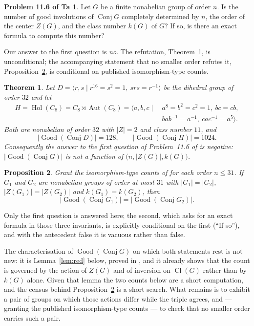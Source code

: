 \documentclass[11pt]{amsart}
\newtheorem{theorem}{Theorem}[section]
\newtheorem{proposition}[theorem]{Proposition}
\theoremstyle{definition}
\newtheorem*{problem}{Problem 11.6 of Ta}
\newcommand{\Conj}{\operatorname{Conj}}
\newcommand{\Good}{\operatorname{Good}}
\newcommand{\Cl}{\operatorname{Cl}}
\newcommand{\Zc}{Z}
\newcommand{\Hol}{\operatorname{Hol}}
\newcommand{\Aut}{\operatorname{Aut}}
\begin{document}
\begin{problem}
Let $G$ be a finite nonabelian group of order $n$. Is the number of good involutions of
$\Conj G$ completely determined by $n$, the order of the center $\Zc(G)$, and the class
number $k(G)$ of $G$? If so, is there an exact formula to compute this number?
\end{problem}

\noindent
Our answer to the first question is \emph{no}. The refutation, Theorem~\ref{thm:main}, is
unconditional; the accompanying statement that no smaller order refutes it,
Proposition~\ref{prop:min}, is conditional on published isomorphism-type counts.

\begin{theorem}\label{thm:main}
Let $D=\langle r,s\mid r^{16}=s^2=1,\ srs=r^{-1}\rangle$ be the dihedral group of order
$32$ and let
\begin{align*}
 H=\Hol(C_8)=C_8\rtimes\Aut(C_8)
 =\langle a,b,c\mid\ &a^8=b^2=c^2=1,\ bc=cb,\\
                     &bab^{-1}=a^{-1},\ cac^{-1}=a^5\rangle .
\end{align*}
Both are nonabelian of order $32$ with $\lvert \Zc\rvert=2$ and class number $11$, and
\[
 \lvert\Good(\Conj D)\rvert=128,
 \qquad
 \lvert\Good(\Conj H)\rvert=1024 .
\]
Consequently the answer to the first question of Problem~11.6 of \cite{Ta} is negative:
$\lvert\Good(\Conj G)\rvert$ is not a function of $\bigl(n,\lvert \Zc(G)\rvert,k(G)\bigr)$.
\end{theorem}

\begin{proposition}\label{prop:min}
Grant the isomorphism-type counts of \cite{A000001} for each order $n\le 31$. If $G_1$ and
$G_2$ are nonabelian groups of order at most $31$ with
$\lvert G_1\rvert=\lvert G_2\rvert$, $\lvert \Zc(G_1)\rvert=\lvert \Zc(G_2)\rvert$ and
$k(G_1)=k(G_2)$, then
\[
 \lvert\Good(\Conj G_1)\rvert=\lvert\Good(\Conj G_2)\rvert .
\]
\end{proposition}

\noindent
Only the first question is answered here; the second, which asks for an exact formula in
those three invariants, is explicitly conditional on the first (``If so''), and with the
antecedent false it is vacuous rather than false.

The characterisation of $\Good(\Conj G)$ on which both statements rest is not new: it is
Lemma~\ref{lem:red} below, proved in \cite{Ta}, and it already shows that the count is
governed by the action of $\Zc(G)$ and of inversion on $\Cl(G)$ rather than by $k(G)$ alone.
Given that lemma the two counts below are a short computation, and the census behind
Proposition~\ref{prop:min} is a short search. What remains is to exhibit a pair of groups on
which those actions differ while the triple agrees, and --- granting the published
isomorphism-type counts --- to check that no smaller order carries such a pair.
\end{document}
